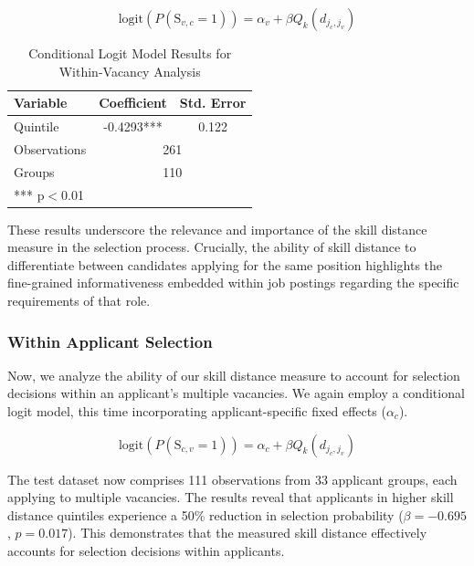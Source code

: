 \begin{equation}
\text{logit}(P(\text{S}_{v,c} = 1)) = \alpha_v + \beta Q_k(d_{j_c,j_v})
\end{equation}

\begin{table}[h]
    \centering
    \caption{Conditional Logit Model Results for Within-Vacancy Analysis}
    \renewcommand{\arraystretch}{1.2}
    \begin{tabular}{lcc}
    \hline
    \textbf{Variable} & \textbf{Coefficient} & \textbf{Std. Error} \\
    \hline
    Quintile & -0.4293*** & 0.122 \\
    \hline
    Observations & \multicolumn{2}{c}{261} \\
    Groups & \multicolumn{2}{c}{110} \\
    \hline
    \multicolumn{3}{l}{\footnotesize{*** p$<$0.01}} \\
    \end{tabular}
    \label{tab:within_vacancy}
\end{table}



These results underscore the relevance and importance of the skill distance measure in the selection process. 
Crucially, the ability of skill distance to differentiate between candidates applying for the same position highlights 
the fine-grained informativeness embedded within job postings regarding the specific requirements of that role.

\subsubsection{Within Applicant Selection}

Now, we analyze the ability of our skill distance measure to account for selection decisions within an applicant's multiple vacancies. We again employ a conditional logit model, 
this time incorporating applicant-specific fixed effects ($\alpha_c$).


\begin{equation}
\text{logit}(P(\text{S}_{c,v} = 1)) = \alpha_c + \beta Q_k(d_{j_c,j_v})
\end{equation}

The test dataset now comprises 111 observations from 33 applicant groups, each applying to multiple vacancies. The results reveal that applicants in higher skill distance 
quintiles experience a 50\% reduction in selection probability (\(\beta = -0.695\), \(p = 0.017\)). This demonstrates that the measured skill distance effectively accounts 
for selection decisions within applicants. 


